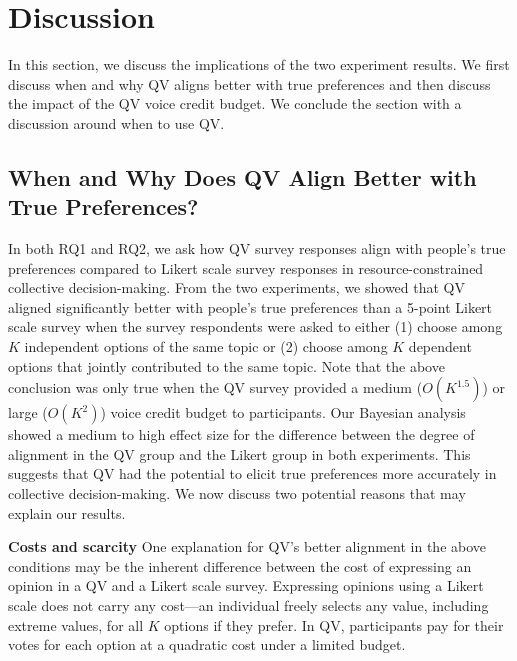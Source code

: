 \section{Discussion} \label{discussion}
In this section, we discuss the implications of the two experiment results. We first discuss when and why QV aligns better with true preferences and then discuss the impact of the QV voice credit budget. We conclude the section with a discussion around when to use QV. 

\subsection{When and Why Does QV Align Better with True Preferences?}
In both RQ1 and RQ2, we ask how QV survey responses align with people's true preferences compared to Likert scale survey responses in resource-constrained collective decision-making. From the two experiments, we showed that QV aligned significantly better with people's true preferences than a 5-point Likert scale survey when the survey respondents were asked to either (1) choose among $K$ independent options of the same topic or (2) choose among $K$ dependent options that jointly contributed to the same topic. Note that the above conclusion was only true when the QV survey provided a medium ($O(K^{1.5})$) or large ($O(K^{2})$) voice credit budget to participants. Our Bayesian analysis showed a medium to high effect size for the difference between the degree of alignment in the QV group and the Likert group in both experiments. This suggests that QV had the potential to elicit true preferences more accurately in collective decision-making. We now discuss two potential reasons that may explain our results.

\textbf{Costs and scarcity}
One explanation for QV's better alignment in the above conditions may be the inherent difference between the cost of expressing an opinion in a QV and a Likert scale survey. Expressing opinions using a Likert scale does not carry any cost---an individual freely selects any value, including extreme values, for all $K$ options if they prefer. In QV, participants pay for their votes for each option at a quadratic cost under a limited budget. 


